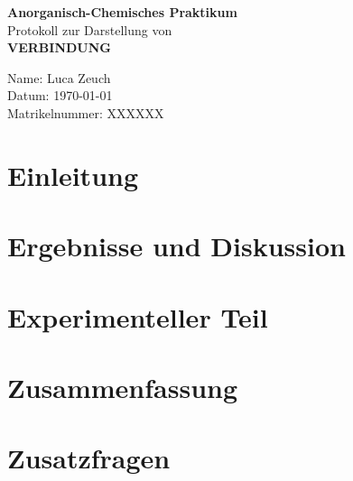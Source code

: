 \documentclass[12pt,a4paper]{scrartcl}
\begin{document}
\begin{titlepage} %
  \vspace*{6cm}
  \begin{center} %
    \Large{\textbf{Anorganisch-Chemisches Praktikum}} \\
    \vspace*{1cm}
    \Large{Protokoll zur Darstellung von} \\
    \vspace*{1cm}
    \large{\textbf{VERBINDUNG} } \\
  \end{center} %
  \vspace*{5cm}
  Name: Luca Zeuch \\
  Datum: \today \\
  Matrikelnummer: XXXXXX \\
\end{titlepage} %


\section{Einleitung} %

\section{Ergebnisse und Diskussion} %

\section{Experimenteller Teil} %

\section{Zusammenfassung} %

\section{Zusatzfragen} %

\newpage
\printbibliography
\end{document}
